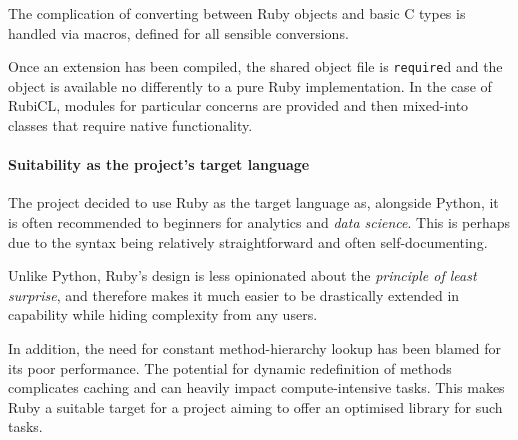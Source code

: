 The complication of converting between Ruby objects and basic C types is handled via macros, defined for all sensible conversions.

Once an extension has been compiled, the shared object file is \verb|require|d and the object is available no differently to a pure Ruby implementation. In the case of RubiCL, modules for particular concerns are provided and then mixed-into classes that require native functionality.

\paragraph*{Suitability as the project's target language}
The project decided to use Ruby as the target language as, alongside Python, it is often recommended to beginners for analytics and \emph{data science}. This is perhaps due to the syntax being relatively straightforward and often self-documenting.

Unlike Python, Ruby's design is less opinionated about the \emph{principle of least surprise}, and therefore makes it much easier to be drastically extended in capability while hiding complexity from any users. 

In addition, the need for constant method-hierarchy lookup has been blamed for its poor performance. The potential for dynamic redefinition of methods complicates caching and can heavily impact compute-intensive tasks. This makes Ruby a suitable target for a project aiming to offer an optimised library for such tasks.
